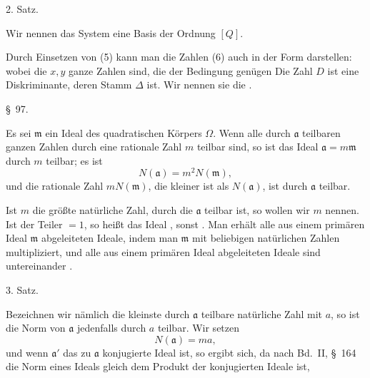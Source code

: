 
2. Satz. 

Wir nennen das System
eine Basis der Ordnung $[Q]$.

Durch Einsetzen von (5) kann man die Zahlen (6) auch in der Form darstellen:
wobei die $x, y$ ganze Zahlen sind, die der Bedingung genügen
Die Zahl $D$ ist eine Diskriminante, deren Stamm $\Delta$ ist. Wir nennen sie die .

\begin{center}
\S\ 97. 
\end{center}

Es sei $\mathfrak{m}$ ein Ideal des quadratischen Körpers $\Omega$. Wenn alle durch $\mathfrak{a}$ teilbaren ganzen Zahlen durch eine rationale Zahl $m$ teilbar sind, so ist das Ideal $\mathfrak{a} = m\mathfrak{m}$ durch $m$ teilbar; es ist
\[ N(\mathfrak{a}) = m^2 N(\mathfrak{m}), \]
und die rationale Zahl $m N(\mathfrak{m})$, die kleiner ist als $N(\mathfrak{a})$, ist durch $\mathfrak{a}$ teilbar.

Ist $m$ die größte natürliche Zahl, durch die $\mathfrak{a}$ teilbar ist, so wollen wir $m$  nennen. Ist der Teiler $= 1$, so heißt das Ideal , sonst . Man erhält alle aus einem primären Ideal $\mathfrak{m}$ abgeleiteten Ideale, indem man $\mathfrak{m}$ mit beliebigen natürlichen Zahlen multipliziert, und alle aus einem primären Ideal abgeleiteten Ideale sind untereinander .

3. Satz. 

Bezeichnen wir nämlich die kleinste durch $\mathfrak{a}$ teilbare natürliche Zahl mit $a$, so ist die Norm von $\mathfrak{a}$ jedenfalls durch $a$ teilbar. Wir setzen
\[ N(\mathfrak{a}) = ma, \]
und wenn $\mathfrak{a}'$ das zu $\mathfrak{a}$ konjugierte Ideal ist, so ergibt sich, da nach Bd.\ II, \S\ 164 die Norm eines Ideals gleich dem Produkt der konjugierten Ideale ist,
